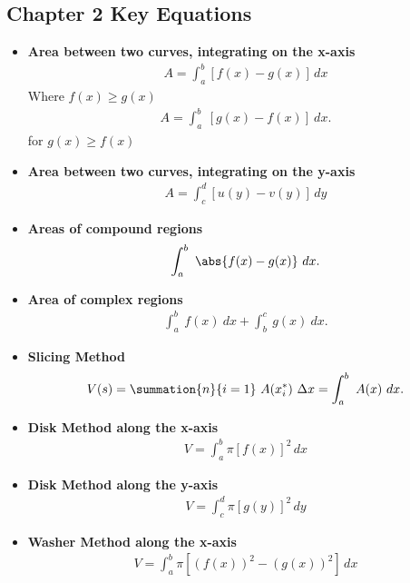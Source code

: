 \documentclass{report}
\begin{document}
    \pagebreak \bigbreak \noindent 
    \subsection{Chapter 2 Key Equations}
    \bigbreak \noindent 
    \begin{itemize}

    \item \textbf{Area between two curves, integrating on the x-axis}
    \begin{align}
        A = \int_{a}^{b} [f(x) - g(x)] \, dx
    \end{align}
    Where $f(x) \geq g(x)$
    \begin{align*}
        A = \int_{a}^{b}\ [g(x) - f(x)]\ dx
    .\end{align*}
    for $g(x) \geq f(x)$

    \item \textbf{Area between two curves, integrating on the y-axis}
    \begin{align}
        A = \int_{c}^{d} [u(y) - v(y)] \, dy
    \end{align}

    \item \textbf{Areas of compound regions}
        \begin{align*}
          \int_{a}^{b}\ \abs{f(x)-g(x)}\ dx 
        .\end{align*}
    \item \textbf{Area of complex regions}
        \begin{align*}
            \int_{a}^{b}\ f(x)\ dx + \int_{b}^{c}\ g(x)\ dx
        .\end{align*}
    \item \textbf{Slicing Method}
        \begin{align*}
            V(s) = \summation{n}{i=1}\ A(x_{i}^{*})\ \Delta x  = \int_{a}^{b}\ A(x)\ dx
        .\end{align*}
    \item \textbf{Disk Method along the x-axis}
    \begin{align}
        V = \int_{a}^{b} \pi [f(x)]^2 \, dx
    \end{align}

    \item \textbf{Disk Method along the y-axis}
    \begin{align}
        V = \int_{c}^{d} \pi [g(y)]^2 \, dy
    \end{align}

    \item \textbf{Washer Method along the x-axis}
    \begin{align}
        V = \int_{a}^{b} \pi [(f(x))^2 - (g(x))^2] \, dx
    \end{align}


\end{itemize}
\end{document}
